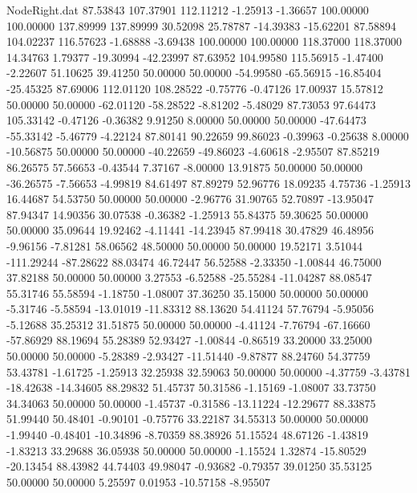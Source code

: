 \begin{filecontents}{NodeRight.dat}
  87.53843  107.37901  112.11212    -1.25913   -1.36657  100.00000  100.00000  137.89999  137.89999   30.52098   25.78787  -14.39383  -15.62201
  87.58894  104.02237  116.57623    -1.68888   -3.69438  100.00000  100.00000  118.37000  118.37000   14.34763    1.79377  -19.30994  -42.23997
  87.63952  104.99580  115.56915    -1.47400   -2.22607   51.10625   39.41250   50.00000   50.00000  -54.99580  -65.56915  -16.85404  -25.45325
  87.69006  112.01120  108.28522    -0.75776   -0.47126   17.00937   15.57812   50.00000   50.00000  -62.01120  -58.28522   -8.81202   -5.48029
  87.73053   97.64473  105.33142    -0.47126   -0.36382    9.91250    8.00000   50.00000   50.00000  -47.64473  -55.33142   -5.46779   -4.22124
  87.80141   90.22659   99.86023    -0.39963   -0.25638    8.00000  -10.56875   50.00000   50.00000  -40.22659  -49.86023   -4.60618   -2.95507
  87.85219   86.26575   57.56653    -0.43544    7.37167   -8.00000   13.91875   50.00000   50.00000  -36.26575   -7.56653   -4.99819   84.61497
  87.89279   52.96776   18.09235     4.75736   -1.25913   16.44687   54.53750   50.00000   50.00000   -2.96776   31.90765   52.70897  -13.95047
  87.94347   14.90356   30.07538    -0.36382   -1.25913   55.84375   59.30625   50.00000   50.00000   35.09644   19.92462   -4.11441  -14.23945
  87.99418   30.47829   46.48956    -9.96156   -7.81281   58.06562   48.50000   50.00000   50.00000   19.52171    3.51044 -111.29244  -87.28622
  88.03474   46.72447   56.52588    -2.33350   -1.00844   46.75000   37.82188   50.00000   50.00000    3.27553   -6.52588  -25.55284  -11.04287
  88.08547   55.31746   55.58594    -1.18750   -1.08007   37.36250   35.15000   50.00000   50.00000   -5.31746   -5.58594  -13.01019  -11.83312
  88.13620   54.41124   57.76794    -5.95056   -5.12688   35.25312   31.51875   50.00000   50.00000   -4.41124   -7.76794  -67.16660  -57.86929
  88.19694   55.28389   52.93427    -1.00844   -0.86519   33.20000   33.25000   50.00000   50.00000   -5.28389   -2.93427  -11.51440   -9.87877
  88.24760   54.37759   53.43781    -1.61725   -1.25913   32.25938   32.59063   50.00000   50.00000   -4.37759   -3.43781  -18.42638  -14.34605
  88.29832   51.45737   50.31586    -1.15169   -1.08007   33.73750   34.34063   50.00000   50.00000   -1.45737   -0.31586  -13.11224  -12.29677
  88.33875   51.99440   50.48401    -0.90101   -0.75776   33.22187   34.55313   50.00000   50.00000   -1.99440   -0.48401  -10.34896   -8.70359
  88.38926   51.15524   48.67126    -1.43819   -1.83213   33.29688   36.05938   50.00000   50.00000   -1.15524    1.32874  -15.80529  -20.13454
  88.43982   44.74403   49.98047    -0.93682   -0.79357   39.01250   35.53125   50.00000   50.00000    5.25597    0.01953  -10.57158   -8.95507

\end{filecontents}
